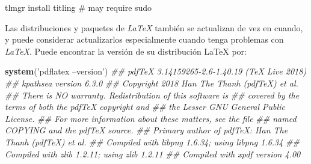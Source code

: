 \documentclass[12pt,]{krantz}
\makeatletter
\newenvironment{Shaded}{\begin{snugshade}}{\end{snugshade}}
\newcommand{\CommentTok}[1]{\textcolor[rgb]{0.56,0.35,0.01}{\textit{#1}}}
\newcommand{\ExtensionTok}[1]{#1}
\newcommand{\KeywordTok}[1]{\textcolor[rgb]{0.13,0.29,0.53}{\textbf{#1}}}
\newcommand{\NormalTok}[1]{#1}
\newcommand{\StringTok}[1]{\textcolor[rgb]{0.31,0.60,0.02}{#1}}
\newenvironment{kframe}{%
\medskip{}
\setlength{\fboxsep}{.8em}
 \def\at@end@of@kframe{}%
 \ifinner\ifhmode%
  \def\at@end@of@kframe{\end{minipage}}%
  \begin{minipage}{\columnwidth}%
 \fi\fi%
 \def\FrameCommand##1{\hskip\@totalleftmargin \hskip-\fboxsep
 \colorbox{shadecolor}{##1}\hskip-\fboxsep
     \hskip-\linewidth \hskip-\@totalleftmargin \hskip\columnwidth}%
 \MakeFramed {\advance\hsize-\width
   \@totalleftmargin\z@ \linewidth\hsize
   \@setminipage}}%
 {\par\unskip\endMakeFramed%
 \at@end@of@kframe}
\renewenvironment{Shaded}{\begin{kframe}}{\end{kframe}}
\makeatother
\begin{document}
\begin{Shaded}
\begin{Highlighting}[]
\ExtensionTok{tlmgr}\NormalTok{ install titling  # may require sudo}
\end{Highlighting}
\end{Shaded}

Las distribuciones y paquetes de \emph{LaTeX} también se actualizan de vez en cuando, y puede considerar actualizarlos especialmente cuando tenga problemas con \emph{LaTeX}. Puede encontrar la versión de su distribución LaTeX por:

\begin{Shaded}
\begin{Highlighting}[]
\KeywordTok{system}\NormalTok{(}\StringTok{'pdflatex --version'}\NormalTok{)}
\CommentTok{## pdfTeX 3.14159265-2.6-1.40.19 (TeX Live 2018)}
\CommentTok{## kpathsea version 6.3.0}
\CommentTok{## Copyright 2018 Han The Thanh (pdfTeX) et al.}
\CommentTok{## There is NO warranty.  Redistribution of this software is}
\CommentTok{## covered by the terms of both the pdfTeX copyright and}
\CommentTok{## the Lesser GNU General Public License.}
\CommentTok{## For more information about these matters, see the file}
\CommentTok{## named COPYING and the pdfTeX source.}
\CommentTok{## Primary author of pdfTeX: Han The Thanh (pdfTeX) et al.}
\CommentTok{## Compiled with libpng 1.6.34; using libpng 1.6.34}
\CommentTok{## Compiled with zlib 1.2.11; using zlib 1.2.11}
\CommentTok{## Compiled with xpdf version 4.00}
\end{Highlighting}
\end{Shaded}



\backmatter
\printindex
\end{document}
